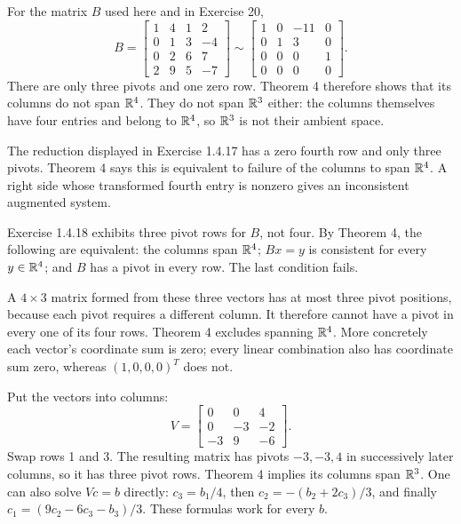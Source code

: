 For the matrix $B$ used here and in Exercise 20,
\[B=\left[\begin{matrix}1 & 4 & 1 & 2\\0 & 1 & 3 & -4\\0 & 2 & 6 & 7\\2 & 9 & 5 & -7\end{matrix}\right]\sim\left[\begin{matrix}1 & 0 & -11 & 0\\0 & 1 & 3 & 0\\0 & 0 & 0 & 1\\0 & 0 & 0 & 0\end{matrix}\right].\]
There are only three pivots and one zero row. Theorem 4 therefore
shows that its columns do not span $\mathbb{R}^4$.
They do not span $\mathbb{R}^3$ either: the columns themselves have four
entries and belong to $\mathbb{R}^4$, so $\mathbb{R}^3$ is not their ambient space.

The reduction displayed in Exercise 1.4.17 has a zero fourth row and
only three pivots. Theorem 4 says this is equivalent to failure of the
columns to span $\mathbb{R}^4$. A right side whose transformed fourth entry
is nonzero gives an inconsistent augmented system.

Exercise 1.4.18 exhibits three pivot rows for $B$, not four.
By Theorem 4, the following are equivalent: the columns span $\mathbb{R}^4$;
$Bx=y$ is consistent for every $y\in\mathbb{R}^4$; and $B$ has a pivot in
every row. The last condition fails.

A $4\times3$ matrix formed from these three vectors has at most
three pivot positions, because each pivot requires a different column.
It therefore cannot have a pivot in every one of its four rows.
Theorem 4 excludes spanning $\mathbb{R}^4$. More concretely each vector's
coordinate sum is zero; every linear combination also has coordinate
sum zero, whereas $(1,0,0,0)^T$ does not.

Put the vectors into columns:
\[V=\begin{bmatrix}0&0&4\\0&-3&-2\\-3&9&-6\end{bmatrix}.\]
Swap rows 1 and 3. The resulting matrix has pivots $-3,-3,4$
in successively later columns, so it has three pivot rows. Theorem 4
implies its columns span $\mathbb{R}^3$. One can also solve $Vc=b$ directly:
$c_3=b_1/4$, then $c_2=-(b_2+2c_3)/3$, and finally
$c_1=(9c_2-6c_3-b_3)/3$. These formulas work for every $b$.

